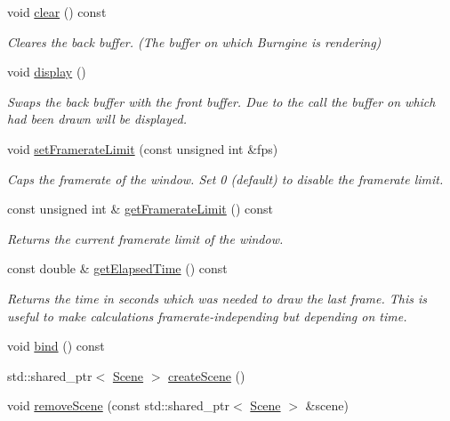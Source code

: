 \begin{DoxyCompactItemize}
void \hyperlink{classburn_1_1_window_a2e6c75cedaeb5571aaac2921bf8bcb6e}{clear} () const 
\begin{DoxyCompactList}\small\item\em Cleares the back buffer. (The buffer on which Burngine is rendering) \end{DoxyCompactList}\item 
void \hyperlink{classburn_1_1_window_a017ddbce346ebe3e11e2abc6ce0948e0}{display} ()
\begin{DoxyCompactList}\small\item\em Swaps the back buffer with the front buffer. Due to the call the buffer on which had been drawn will be displayed. \end{DoxyCompactList}\item 
void \hyperlink{classburn_1_1_window_a840d45e13910496fe9edd45d844e46a1}{set\-Framerate\-Limit} (const unsigned int \&fps)
\begin{DoxyCompactList}\small\item\em Caps the framerate of the window. Set 0 (default) to disable the framerate limit. \end{DoxyCompactList}\item 
const unsigned int \& \hyperlink{classburn_1_1_window_aa694b6ed57c02e625fff074f31a107c9}{get\-Framerate\-Limit} () const 
\begin{DoxyCompactList}\small\item\em Returns the current framerate limit of the window. \end{DoxyCompactList}\item 
const double \& \hyperlink{classburn_1_1_window_ae5af78665f468bd19ebb38a8ac13b701}{get\-Elapsed\-Time} () const 
\begin{DoxyCompactList}\small\item\em Returns the time in seconds which was needed to draw the last frame. This is useful to make calculations framerate-\/independing but depending on time. \end{DoxyCompactList}\item 
void \hyperlink{classburn_1_1_window_a7bfc2454c14e5065c67d6bd86cb0af92}{bind} () const 
\item 
std\-::shared\-\_\-ptr$<$ \hyperlink{classburn_1_1_scene}{Scene} $>$ \hyperlink{classburn_1_1_window_acd7968ffd781f6f62259171e4c633031}{create\-Scene} ()
\item 
void \hyperlink{classburn_1_1_window_a4beebeb46f4b35c38c382e1042288f18}{remove\-Scene} (const std\-::shared\-\_\-ptr$<$ \hyperlink{classburn_1_1_scene}{Scene} $>$ \&scene)
\end{DoxyCompactItemize}
